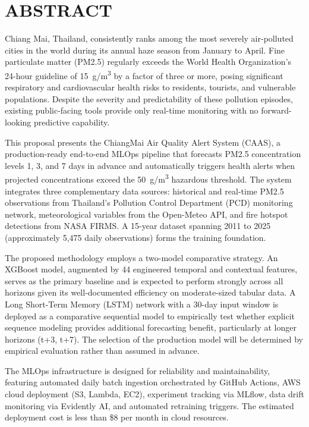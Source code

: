 \documentclass[12pt,a4paper]{report}
\begin{document}
\chapter*{ABSTRACT}

Chiang Mai, Thailand, consistently ranks among the most severely air-polluted cities in the world during its annual haze season from January to April. Fine particulate matter (PM2.5) regularly exceeds the World Health Organization's 24-hour guideline of 15~\textmu g/m\textsuperscript{3} by a factor of three or more, posing significant respiratory and cardiovascular health risks to residents, tourists, and vulnerable populations. Despite the severity and predictability of these pollution episodes, existing public-facing tools provide only real-time monitoring with no forward-looking predictive capability.

This proposal presents the ChiangMai Air Quality Alert System (CAAS), a production-ready end-to-end MLOps pipeline that forecasts PM2.5 concentration levels 1, 3, and 7 days in advance and automatically triggers health alerts when projected concentrations exceed the 50~\textmu g/m\textsuperscript{3} hazardous threshold. The system integrates three complementary data sources: historical and real-time PM2.5 observations from Thailand's Pollution Control Department (PCD) monitoring network, meteorological variables from the Open-Meteo API, and fire hotspot detections from NASA FIRMS. A 15-year dataset spanning 2011 to 2025 (approximately 5,475 daily observations) forms the training foundation.

The proposed methodology employs a two-model comparative strategy. An XGBoost model, augmented by 44 engineered temporal and contextual features, serves as the primary baseline and is expected to perform strongly across all horizons given its well-documented efficiency on moderate-sized tabular data. A Long Short-Term Memory (LSTM) network with a 30-day input window is deployed as a comparative sequential model to empirically test whether explicit sequence modeling provides additional forecasting benefit, particularly at longer horizons (t+3, t+7). The selection of the production model will be determined by empirical evaluation rather than assumed in advance.

The MLOps infrastructure is designed for reliability and maintainability, featuring automated daily batch ingestion orchestrated by GitHub Actions, AWS cloud deployment (S3, Lambda, EC2), experiment tracking via MLflow, data drift monitoring via Evidently AI, and automated retraining triggers. The estimated deployment cost is less than \$8 per month in cloud resources.
\end{document}
